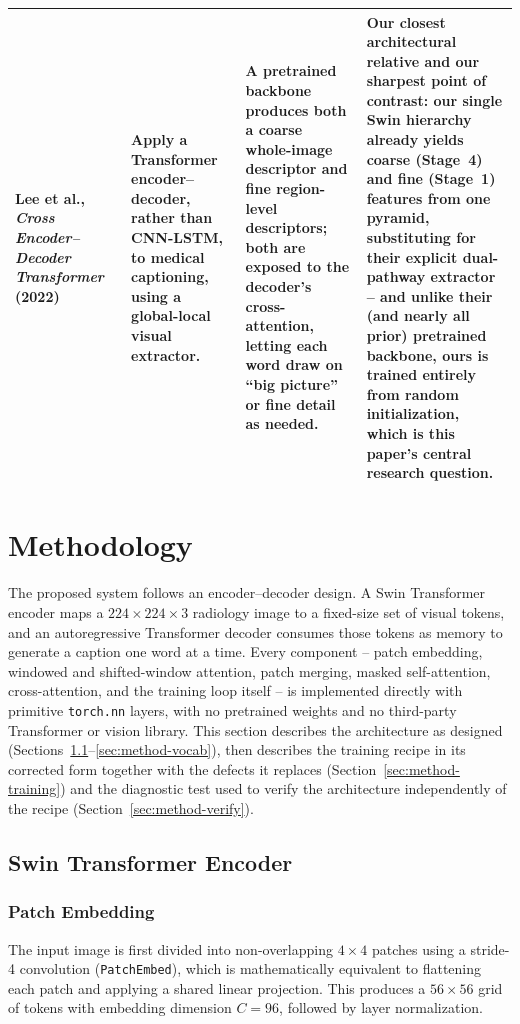 \documentclass[conference]{IEEEtran}
\begin{document}
\begin{table}[t]
\begin{tabularx}{\textwidth}{@{}p{2.3cm}X X X@{}}
Lee et al., \emph{Cross Encoder--Decoder Transformer}~\cite{lee2022cross} (2022)
&
Apply a Transformer encoder--decoder, rather than CNN-LSTM, to medical captioning, using a global-local visual extractor.
&
A pretrained backbone produces both a coarse whole-image descriptor and fine region-level descriptors; both are exposed to the decoder's cross-attention, letting each word draw on ``big picture'' or fine detail as needed.
&
Our closest architectural relative and our sharpest point of contrast: our single Swin hierarchy already yields coarse (Stage~4) and fine (Stage~1) features from one pyramid, substituting for their explicit dual-pathway extractor -- and unlike their (and nearly all prior) pretrained backbone, ours is trained entirely from random initialization, which is this paper's central research question. \\

\bottomrule
\end{tabularx}
\end{table}

\section{Methodology}
\label{sec:method}

The proposed system follows an encoder--decoder design. A Swin Transformer encoder maps a $224\times224\times3$ radiology image to a fixed-size set of visual tokens, and an autoregressive Transformer decoder consumes those tokens as memory to generate a caption one word at a time. Every component -- patch embedding, windowed and shifted-window attention, patch merging, masked self-attention, cross-attention, and the training loop itself -- is implemented directly with primitive \texttt{torch.nn} layers, with no pretrained weights and no third-party Transformer or vision library. This section describes the architecture as designed (Sections~\ref{sec:method-encoder}--\ref{sec:method-vocab}), then describes the training recipe in its corrected form together with the defects it replaces (Section~\ref{sec:method-training}) and the diagnostic test used to verify the architecture independently of the recipe (Section~\ref{sec:method-verify}).

\subsection{Swin Transformer Encoder}
\label{sec:method-encoder}

\subsubsection{Patch Embedding}
The input image is first divided into non-overlapping $4\times4$ patches using a stride-4 convolution (\texttt{PatchEmbed}), which is mathematically equivalent to flattening each patch and applying a shared linear projection. This produces a $56\times56$ grid of tokens with embedding dimension $C=96$, followed by layer normalization.
\end{document}
